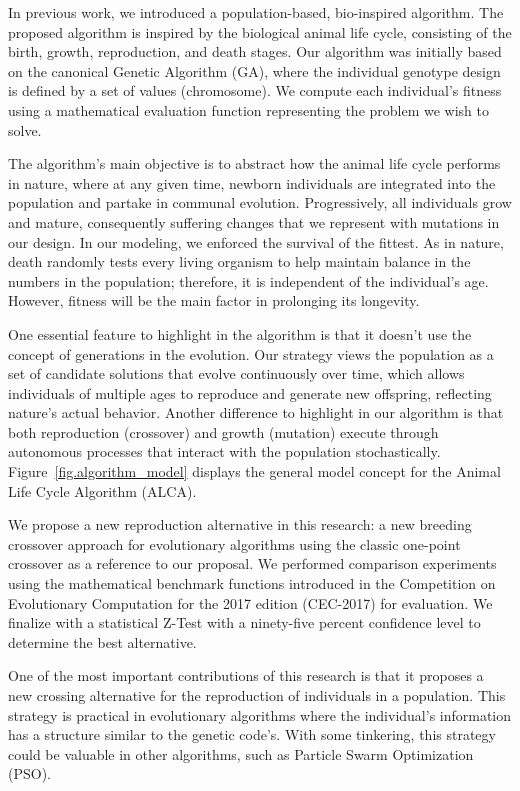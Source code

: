 \documentclass[graybox]{svmult}
\begin{document}
    In previous work, we introduced a population-based, bio-inspired algorithm\cite{Felix-Saul2022,Felix-Saul2023}. The proposed algorithm is inspired by the biological animal life cycle, consisting of the birth, growth, reproduction, and death stages\cite{read1968system}. Our algorithm was initially based on the canonical Genetic Algorithm (GA)\cite{holland1992genetic,holland1984genetic}, where the individual genotype design is defined by a set of values (chromosome). We compute each individual's fitness using a mathematical evaluation function representing the problem we wish to solve.
    
    The algorithm's main objective is to abstract how the animal life cycle performs in nature, where at any given time, newborn individuals are integrated into the population and partake in communal evolution. Progressively, all individuals grow and mature, consequently suffering changes that we represent with mutations in our design. In our modeling, we enforced the survival of the fittest. As in nature, death randomly tests every living organism to help maintain balance in the numbers in the population; therefore, it is independent of the individual's age. However, fitness will be the main factor in prolonging its longevity.

    One essential feature to highlight in the algorithm is that it doesn't use the concept of generations in the evolution. Our strategy views the population as a set of candidate solutions that evolve continuously over time, which allows individuals of multiple ages to reproduce and generate new offspring, reflecting nature's actual behavior. Another difference to highlight in our algorithm is that both reproduction (crossover) and growth (mutation) execute through autonomous processes that interact with the population stochastically. Figure~\ref{fig.algorithm_model} displays the general model concept for the Animal Life Cycle Algorithm (ALCA)\cite{Felix-Saul2023}.

    We propose a new reproduction alternative in this research: a new breeding crossover approach for evolutionary algorithms using the classic one-point crossover as a reference to our proposal. We performed comparison experiments using the mathematical benchmark functions introduced in the Competition on Evolutionary Computation\cite{awad2016problem} for the 2017 edition (CEC-2017) for evaluation. We finalize with a statistical Z-Test with a ninety-five percent confidence level to determine the best alternative.

    One of the most important contributions of this research is that it proposes a new crossing alternative for the reproduction of individuals in a population. This strategy is practical in evolutionary algorithms where the individual's information has a structure similar to the genetic code's. With some tinkering, this strategy could be valuable in other algorithms\cite{venter2003particle,wang2018particle,mcdevitt2022particle}, such as Particle Swarm Optimization (PSO).
\end{document}
